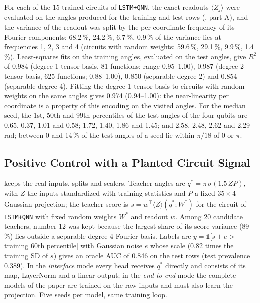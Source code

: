 \documentclass[11pt,a4paper]{article}
\begin{document}
For each of the 15 trained circuits of \texttt{LSTM+QNN}, the exact readouts $\langle Z_j\rangle$ were evaluated on the angles produced for the training and test rows (, part A), and the variance of the readout was split by the per-coordinate frequency of its Fourier components: 68.2\,\%, 24.2\,\%, 6.7\,\%, 0.9\,\% of the variance lies at frequencies 1, 2, 3 and 4 (circuits with random weights: 59.6\,\%, 29.1\,\%, 9.9\,\%, 1.4\,\%). Least-squares fits on the training angles, evaluated on the test angles, give $R^2$ of 0.984 (degree-1 tensor basis, 81 functions; range 0.95--1.00), 0.987 (degree-2 tensor basis, 625 functions; 0.88--1.00), 0.850 (separable degree 2) and 0.854 (separable degree 4). Fitting the degree-1 tensor basis to circuits with random weights on the same angles gives 0.974 (0.94--1.00): the near-linearity per coordinate is a property of this encoding on the visited angles. For the median seed, the 1st, 50th and 99th percentiles of the test angles of the four qubits are 0.65, 0.37, 1.01 and 0.58; 1.72, 1.40, 1.86 and 1.45; and 2.58, 2.48, 2.62 and 2.29 rad; between 0 and 14\,\% of the test angles of a seed lie within $\pi/18$ of 0 or $\pi$.

\subsection{Positive Control with a Planted Circuit Signal}
\label{app:teacher}

 keeps the real inputs, splits and scalers. Teacher angles are $q^\ast=\pi\,\sigma(1.5\,ZP)$, with $Z$ the inputs standardized with training statistics and $P$ a fixed $35\times4$ Gaussian projection; the teacher score is $s=w^\top\langle Z\rangle(q^\ast;W^\ast)$ for the circuit of \texttt{LSTM+QNN} with fixed random weights $W^\ast$ and readout $w$. Among 20 candidate teachers, number 12 was kept because the largest share of its score variance (89\,\%) lies outside a separable degree-4 Fourier basis. Labels are $y=\mathbb 1[s+e>$ training 60th percentile$]$ with Gaussian noise $e$ whose scale (0.82 times the training SD of $s$) gives an oracle AUC of 0.846 on the test rows (test prevalence 0.389). In the \emph{interface} mode every head receives $q^\ast$ directly and consists of its map, LayerNorm and a linear output; in the \emph{end-to-end} mode the complete models of the paper are trained on the raw inputs and must also learn the projection. Five seeds per model, same training loop.
\end{document}
